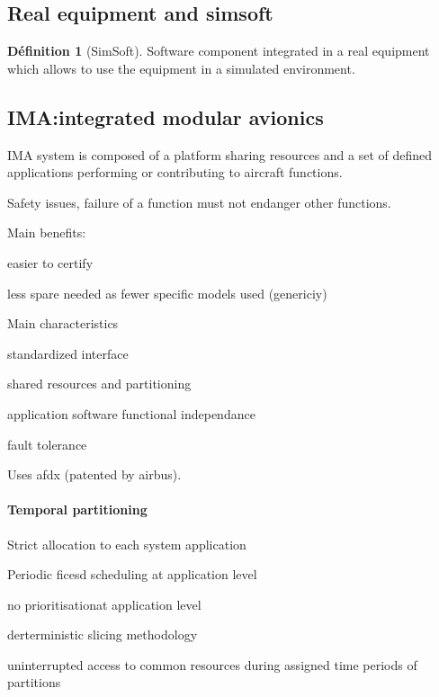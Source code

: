 \documentclass[10pt]{article}
\theoremstyle{plain}
\theoremstyle{definition}
\newtheorem{defn}{Définition}
\theoremstyle{remark}
\begin{document}
\subsection{Real equipment and simsoft}
\begin{defn}
	[SimSoft]
	Software component integrated in a real equipment which allows to use the
	equipment in a simulated environment.
\end{defn}

\subsection{IMA:\@ integrated modular avionics}
IMA system is composed of a platform sharing resources and a set of defined
applications performing or contributing to aircraft functions.

Safety issues, failure of a function must not endanger other functions.

Main benefits:
\begin{compactitem}
	\item easier to certify
	\item less spare needed as fewer specific models used (genericiy)
\end{compactitem}

Main characteristics
\begin{compactitem}
	\item standardized interface
	\item shared resources and partitioning
	\item application software functional independance
	\item fault tolerance
\end{compactitem}

Uses afdx (patented by airbus).

\paragraph{Temporal partitioning}\label{par:temporal_partitioning}

\begin{compactitem}
	\item Strict allocation to each system application
	\item Periodic ficesd scheduling at application level
	\item no prioritisationat application level
	\item derterministic slicing methodology
	\item uninterrupted access to common resources during assigned time periods
		of partitions
\end{compactitem}
\end{document}

